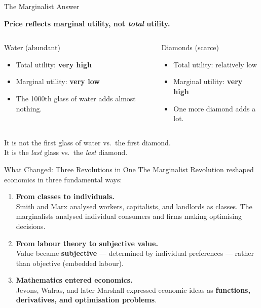 \documentclass[aspectratio=169, 10pt]{beamer}
\begin{document}
\begin{frame}{The Marginalist Answer}
\begin{center}
\textbf{Price reflects \alert{marginal} utility, not \textit{total} utility.}
\end{center}
\vspace{0.5em}
\begin{columns}[T]
\begin{block}{Water (abundant)}
  \begin{itemize}
    \item Total utility: \textbf{very high}
    \item Marginal utility: \textbf{very low}
    \item The 1000th glass of water adds almost nothing.
  \end{itemize}
\end{block}
\begin{block}{Diamonds (scarce)}
  \begin{itemize}
    \item Total utility: relatively low
    \item Marginal utility: \textbf{very high}
    \item One more diamond adds a lot.
  \end{itemize}
\end{block}
\end{columns}
\vspace{1em}
It is not the first glass of water vs.\ the first diamond.\\
It is the \textit{last} glass vs.\ the \textit{last} diamond.
\end{frame}

\begin{frame}{What Changed: Three Revolutions in One}
The Marginalist Revolution reshaped economics in three fundamental ways:
\vspace{1em}
\begin{enumerate}
  \item \textbf{From classes to individuals.}\\
        Smith and Marx analysed workers, capitalists, and landlords as classes.
        The marginalists analysed individual consumers and firms making
        \alert{optimising decisions}.
  \vspace{0.5em}
  \item \textbf{From labour theory to subjective value.}\\
        Value became \textbf{subjective} --- determined by individual preferences
        --- rather than objective (embedded labour).
  \vspace{0.5em}
  \item \textbf{Mathematics entered economics.}\\
        Jevons, Walras, and later Marshall expressed economic ideas as
        \textbf{functions, derivatives, and optimisation problems}.
\end{enumerate}
\end{frame}
\end{document}
